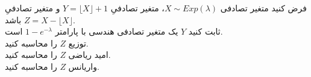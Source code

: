 \problem{}
فرض کنید متغیر تصادفی
\( X \sim Exp(\lambda)\)،
متغیر تصادفیِ 
\( Y = \lfloor X \rfloor + 1\) 
و متغیر تصادفیِ
\( Z =  X - \lfloor X \rfloor \) 
باشد.\\
[5pt]
\subproblem{}
 ثابت کنید \( Y \) یک متغیر تصادفی هندسی با پارامتر 
\( 1 - e^{-\lambda} \)
است.
\\
\subproblem{}
توزیع \( Z \) را محاسبه کنید.
\\
\subproblem{}
امید ریاضی \( Z \) را محاسبه کنید.
\\
\subproblem{}
واریانس \( Z \) را محاسبه کنید.